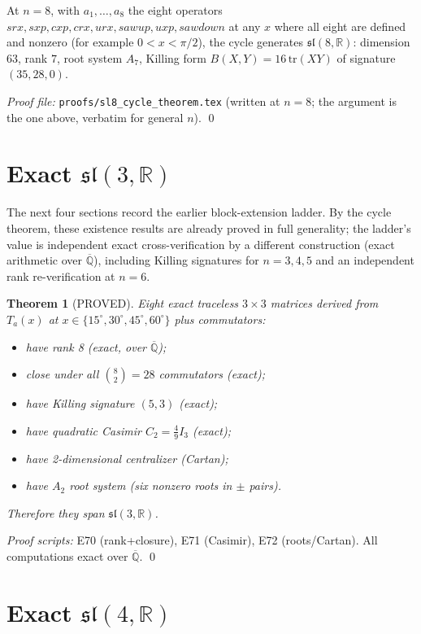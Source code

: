 \documentclass[11pt]{article}
\newtheorem{theorem}{Theorem}
\theoremstyle{definition}
\begin{document}
\begin{corollary}[PROVED]
At $n=8$, with $a_1,\dots,a_8$ the eight operators $srx, sxp, cxp, crx, urx, sawup, uxp, sawdown$ at any $x$ where all eight are defined and nonzero (for example $0<x<\pi/2$), the cycle generates $\mathfrak{sl}(8,\mathbb{R})$: dimension $63$, rank $7$, root system $A_7$, Killing form $B(X,Y)=16\,\mathrm{tr}(XY)$ of signature $(35,28,0)$.
\end{corollary}

\noindent\textit{Proof file:} \texttt{proofs/sl8\_cycle\_theorem.tex} (written at $n=8$; the argument is the one above, verbatim for general $n$). \qed

\section{Exact $\mathfrak{sl}(3,\mathbb{R})$}

The next four sections record the earlier block-extension ladder. By the cycle theorem, these existence results are already proved in full generality; the ladder's value is independent exact cross-verification by a different construction (exact arithmetic over $\overline{\mathbb{Q}}$), including Killing signatures for $n=3,4,5$ and an independent rank re-verification at $n=6$.

\begin{theorem}[PROVED]
Eight exact traceless $3\times3$ matrices derived from $T_a(x)$ at $x\in\{15^\circ,30^\circ,45^\circ,60^\circ\}$ plus commutators:
\begin{itemize}
\item have rank 8 (exact, over $\overline{\mathbb{Q}}$);
\item close under all $\binom{8}{2}=28$ commutators (exact);
\item have Killing signature $(5,3)$ (exact);
\item have quadratic Casimir $C_2 = \frac{4}{9}I_3$ (exact);
\item have 2-dimensional centralizer (Cartan);
\item have $A_2$ root system (six nonzero roots in $\pm$ pairs).
\end{itemize}
Therefore they span $\mathfrak{sl}(3,\mathbb{R})$.
\end{theorem}

\noindent\textit{Proof scripts:} E70 (rank+closure), E71 (Casimir), E72 (roots/Cartan). All computations exact over $\overline{\mathbb{Q}}$. \qed

\section{Exact $\mathfrak{sl}(4,\mathbb{R})$}
\end{document}
